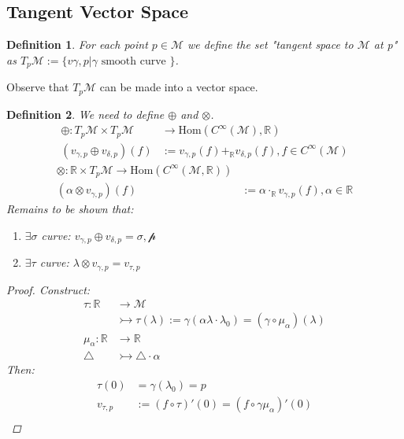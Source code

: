 \documentclass[10pt, oneside]{article}
\newcommand{\R}{\mathbb{R}}
\newcommand{\M}{\mathcal{M}}
\newtheorem{defn}{Definition}
\begin{document}
  \subsection*{Tangent Vector Space}
     \begin{defn}
        For each point $p \in \M$ we define the set "tangent space to $\M$ at p" as $T_p \M := \{v{\gamma,p} | \gamma \text{ smooth curve } \}$.
     \end{defn}
     Observe that $T_p \M$ can be made into a vector space.
     \begin{defn}
        We need to define $\oplus$ and $\otimes$.
        \begin{align*}
           \oplus: T_p \M \times T_p \M &\to \text{Hom}(C^\infty(\M),\R) \\
           (v_{\gamma,p} \oplus v_{\delta,p})(f) &:= v_{\gamma,p}(f) +_{\R} v_{\delta,p} (f), f \in C^\infty (\M)
        \end{align*}
        \begin{align*}
           \otimes: \R \times T_p \M \to \text{Hom}(C^\infty(\M,\R)) \\
           (\alpha \otimes v_{\gamma,p})(f) &:= \alpha \cdot_{\R} v_{\gamma,p} (f), \alpha \in \R
        \end{align*}
        Remains to be shown that:
        \begin{enumerate}
           \item $\exists \sigma$ curve: $v_{\gamma,p} \oplus v_{\delta,p} = \mathcal{\sigma,p}$
           \item $\exists \tau$ curve: $\lambda \otimes v_{\gamma,p} = v_{\tau,p}$
        \end{enumerate}
        \begin{proof}
           Construct:
           \begin{align*}
              \tau: \R &\to \M \\
              &\rightarrowtail \tau(\lambda) := \gamma(\alpha \lambda \cdot \lambda_0) = (\gamma \circ \mu_{\alpha})(\lambda) \\
              \mu_\alpha: \R &\to \R \\
              \triangle &\rightarrowtail \triangle \cdot \alpha
           \end{align*}
           Then:
           \begin{align*}
              \tau (0) &= \gamma(\lambda_0) = p \\
              v_{\tau,p} &:= (f \circ \tau)'(0) = (f \circ \gamma \mu_\alpha)'(0) \\

\end{align*}
\end{proof}
\end{defn}
\end{document}
